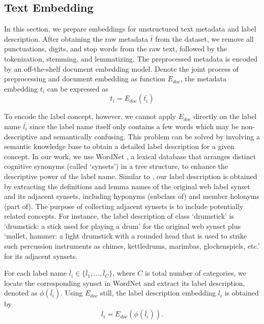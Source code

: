 \documentclass[sigconf]{acmart}
\begin{document}
\subsection{Text Embedding}
\label{S:metadata}
In this section, we prepare embeddings for unstructured text metadata and label description. After obtaining the raw metadata $\bar{t}$ from the dataset, we remove all punctuations, digits, and stop words from the raw text, followed by the tokenization, stemming, and lemmatizing. The preprocessed metadata is encoded by an off-the-shelf document embedding model. Denote the joint process of preprocessing and document embedding as function $E_{doc}$, the metadata embedding $t_i$ can be expressed as
\begin{equation}
\label{E:metadata}
t_i = E_{doc}(\bar{t_i})
\end{equation}

To encode the label concept, however, we cannot apply $E_{doc}$ directly on the label name $\bar{l_i}$ since the label name itself only contains a few words which may be non-descriptive and semantically confusing. This problem can be solved by involving a semantic knowledge base to obtain a detailed label description for a given concept. In our work, we use WordNet \cite{miller1998wordnet}, a lexical database that arranges distinct cognitive synonyms (called `synsets’) in a tree structure, to enhance the descriptive power of the label name. Similar to \cite{wei2015labeldescription}, our label description is obtained by extracting the definitions and lemma names of the original web label synset and its adjacent synsets, including hyponyms (subclass of) and member holonyms (part of). The purpose of collecting adjacent synsets is to include potentially related concepts. For instance, the label description of class `drumstick' is `drumstick: a stick used for playing a drum' for the original web synset plus `mallet, hammer: a light drumstick with a rounded head that is used to strike such percussion instruments as chimes, kettledrums, marimbas, glockenspiels, etc.' for its adjacent synsets. 

For each label name $\bar{l}_i\in \{\bar{l}_1,\dots,\bar{l}_C\}$, where $C$ is total number of categories, we locate the corresponding synset in WordNet and extract its label description, denoted as $\phi(\bar{l_i})$. Using $E_{doc}$ still, the label description embedding $l_i$ is obtained by
\begin{equation}
\label{E:label_description}
l_i = E_{doc}(\phi(\bar{l_i})).
\end{equation}
\end{document}
